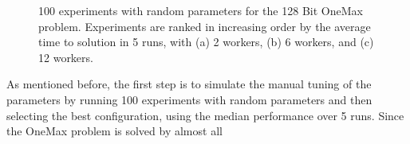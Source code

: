 \documentclass[conference]{IEEEtran}
\begin{document}
\begin{figure}[h!t]
    \centering

    \caption{100 experiments with random parameters for the 128 Bit OneMax problem.
    Experiments are ranked in increasing order by the average time to solution in 5 runs, with
    (a) 2 workers, (b) 6 workers, and (c) 12 workers.}
    \label{fig:effort}
  \end{figure}
As mentioned before, the first step is to simulate the manual tuning of the parameters
by running 100 experiments with random parameters and then selecting the best configuration,
using the median performance over 5 runs. Since the OneMax problem is solved by almost all
\end{document}
